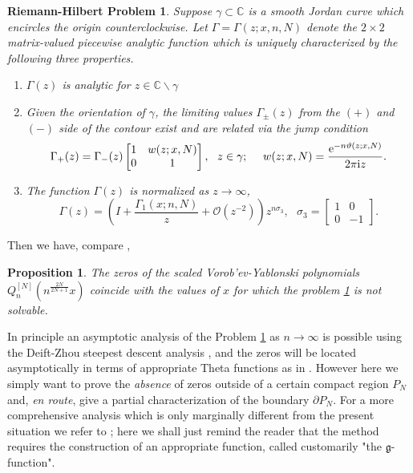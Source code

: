 \documentclass[10pt,reqno,oneside]{amsart}
\def \gg{{\mathfrak g}}
\newcommand{\im}{\mathrm{i}}
\numberwithin{equation}{section}
\newtheorem{problem}[theo]{Riemann-Hilbert Problem}
\newtheorem{proposition}[theo]{Proposition}
\def\bp{\begin{proposition}}
\def\ep{\end{proposition}}
\def \pa{\partial}
\begin{document}
\begin{problem}\label{master} Suppose $\gamma\subset\mathbb{C}$ is a smooth Jordan curve which encircles the origin counterclockwise. Let $\Gamma=\Gamma(z;x,n,N)       $ denote the $2\times 2$ matrix-valued piecewise analytic function which is uniquely characterized by the following three properties.
\begin{enumerate}
	\item $\Gamma(z)$ is analytic for $z\in\mathbb{C}\backslash\gamma$
	\item Given the orientation of $\gamma$, the limiting values $\Gamma_{\pm}(z)$ from the $(+)$ and $(-)$ side of the contour exist and are related via the jump condition
	\begin{equation*}
		\Gamma_+(z)=\Gamma_-(z)\begin{bmatrix}
		1 & w(z;x,N)\\
		0 & 1
		\end{bmatrix},\ \ z\in\gamma;\ \ \ \ w(z;x,N)=\frac{{\rm e}^{-n \vartheta(z;x,N)}}{2\pi\im z}.
	\end{equation*}
	\item The function $\Gamma(z)$ is normalized as $z\rightarrow\infty$,
	\begin{equation*}
		\Gamma(z)=\left(I+\frac{\Gamma_1(x;n,N)}{z}+\mathcal{O}\left(z^{-2}\right)\right)z^{n\sigma_3},\ \ \ \sigma_3=\begin{bmatrix}
		1 & 0\\
		0 & -1
		\end{bmatrix}.
	\end{equation*}
\end{enumerate}
\end{problem}
%
Then we have, compare \cite{BB},
\bp
The zeros of the scaled Vorob'ev-Yablonski polynomials $Q_n^{[N]}(n^{\frac {2N}{2N+1}} x)$ coincide with the values of $x$ for which the problem \ref{master} is {\em not} solvable.
\ep
In principle an asymptotic analysis of the Problem \ref{master} as $n\to\infty$ is possible using the Deift-Zhou steepest descent analysis \cite{DZ1,DVZ,DKMVZ}, and the zeros will be located asymptotically in terms of appropriate Theta functions as in \cite{BB}. However here we simply want to prove the {\em absence} of zeros outside of a certain compact region $P_N$ and, {\em en route}, give a partial  characterization of the boundary $\pa P_N$.  For a more comprehensive analysis which is only marginally different from the present situation we refer to \cite{BB}; here we shall just remind the reader that the method requires the construction of an appropriate function, called customarily "the $\gg$-function".\smallskip
\end{document}
